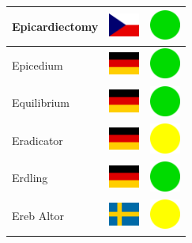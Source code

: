 \documentclass[12pt, a4paper, twoside]{report}
\begin{document}
\begin{center}
\begin{longtable}{|p{5cm}|p{2cm}|p{2cm}|}
 Epicardiectomy                                             & \includegraphics[width=1cm]{../img/flags/cz} &   \includegraphics[width=1cm]{../likes/y} \\ \hline
 Epicedium                                                  & \includegraphics[width=1cm]{../img/flags/de} &   \includegraphics[width=1cm]{../likes/y} \\ \hline
 Equilibrium                                                & \includegraphics[width=1cm]{../img/flags/de} &   \includegraphics[width=1cm]{../likes/y} \\ \hline
 Eradicator                                                 & \includegraphics[width=1cm]{../img/flags/de} &   \includegraphics[width=1cm]{../likes/m} \\ \hline
 Erdling                                                    & \includegraphics[width=1cm]{../img/flags/de} &   \includegraphics[width=1cm]{../likes/y} \\ \hline
 Ereb Altor                                                 & \includegraphics[width=1cm]{../img/flags/se} &   \includegraphics[width=1cm]{../likes/m} \\ \hline

\end{longtable}
\end{center}
\end{document}
